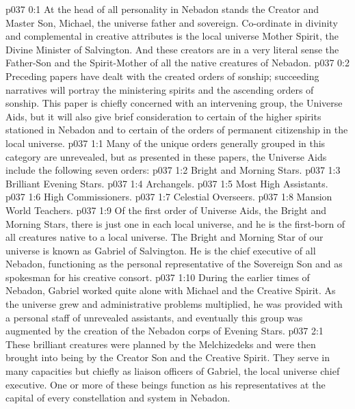 \author{Brilliant Evening Star}
\vs p037 0:1 At the head of all personality in Nebadon stands the Creator and Master Son, Michael, the universe father and sovereign. Co\hyp{}ordinate in divinity and complemental in creative attributes is the local universe Mother Spirit, the Divine Minister of Salvington. And these creators are in a very literal sense the Father\hyp{}Son and the Spirit\hyp{}Mother of all the native creatures of Nebadon.
\vs p037 0:2 Preceding papers have dealt with the created orders of sonship; succeeding narratives will portray the ministering spirits and the ascending orders of sonship. This paper is chiefly concerned with an intervening group, the Universe Aids, but it will also give brief consideration to certain of the higher spirits stationed in Nebadon and to certain of the orders of permanent citizenship in the local universe.
\vs p037 1:1 Many of the unique orders generally grouped in this category are unrevealed, but as presented in these papers, the Universe Aids include the following seven orders:
\vs p037 1:2 \bibnobreakspace Bright and Morning Stars.
\vs p037 1:3 \bibnobreakspace Brilliant Evening Stars.
\vs p037 1:4 \bibnobreakspace Archangels.
\vs p037 1:5 \bibnobreakspace Most High Assistants.
\vs p037 1:6 \bibnobreakspace High Commissioners.
\vs p037 1:7 \bibnobreakspace Celestial Overseers.
\vs p037 1:8 \bibnobreakspace Mansion World Teachers.
\vs p037 1:9 \pc Of the first order of Universe Aids, the Bright and Morning Stars, there is just one in each local universe, and he is the first\hyp{}born of all creatures native to a local universe. The Bright and Morning Star of our universe is known as Gabriel of Salvington. He is the chief executive of all Nebadon, functioning as the personal representative of the Sovereign Son and as spokesman for his creative consort.
\vs p037 1:10 During the earlier times of Nebadon, Gabriel worked quite alone with Michael and the Creative Spirit. As the universe grew and administrative problems multiplied, he was provided with a personal staff of unrevealed assistants, and eventually this group was augmented by the creation of the Nebadon corps of Evening Stars.
\vs p037 2:1 These brilliant creatures were planned by the Melchizedeks and were then brought into being by the Creator Son and the Creative Spirit. They serve in many capacities but chiefly as liaison officers of Gabriel, the local universe chief executive. One or more of these beings function as his representatives at the capital of every constellation and system in Nebadon.
